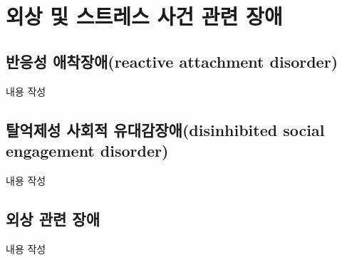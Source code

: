 \section{외상 및 스트레스 사건 관련 장애}

\subsection{반응성 애착장애(reactive attachment disorder)}
내용 작성

\subsection{탈억제성 사회적 유대감장애(disinhibited social engagement disorder)}
내용 작성

\subsection{외상 관련 장애}
내용 작성
